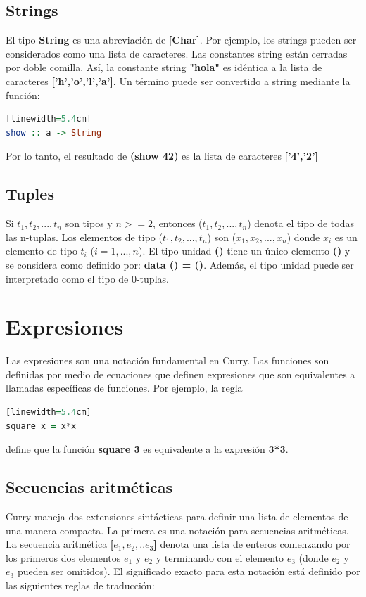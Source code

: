 \documentclass[10pt,journal,compsoc]{IEEEtran}
\begin{document}
\subsection{Strings}
El tipo \textbf{String} es una abreviaci\'on de \textbf{[Char]}. Por ejemplo, los strings pueden ser considerados como una lista de caracteres. Las constantes string est\'an cerradas por doble comilla. As\'i, la constante string \textbf{"hola"} es id\'entica a la lista de caracteres \textbf{['h','o','l','a']}. Un t\'ermino puede ser convertido a string mediante la funci\'on:
\begin{lstlisting}[language=Haskell, caption = {C\'odigo de conversi\'on de un t\'ermino a String}][linewidth=5.4cm]
show :: a -> String
\end{lstlisting}
Por lo tanto, el resultado de \textbf{(show 42)} es la lista de caracteres \textbf{['4','2']}

\subsection{Tuples}
Si $t_{1},t_{2},...,t_{n}$ son tipos y $n >= 2$, entonces ($t_{1},t_{2},...,t_{n}$) denota el tipo de todas las n-tuplas. Los elementos de tipo ($t_{1},t_{2},...,t_{n}$) son ($x_{1},x_{2},...,x_{n}$) donde $x_{i}$ es un elemento de tipo $t_{i}$ ($i = 1, ..., n$).
El tipo unidad \textbf{()} tiene un \'unico elemento \textbf{()} y se considera como definido por: \textbf{data () = ()}. Adem\'as, el tipo unidad puede ser interpretado como el tipo de 0-tuplas.

\section{Expresiones}
Las expresiones son una notaci\'on fundamental en Curry. Las funciones son definidas por medio de ecuaciones que definen expresiones que son equivalentes a llamadas espec\'ificas de funciones. Por ejemplo, la regla 
\begin{lstlisting}[language=Haskell, caption = {C\'odigo de una simple expresi\'on.}][linewidth=5.4cm]
square x = x*x
\end{lstlisting}
define que la funci\'on \textbf{square 3} es equivalente a la expresi\'on \textbf{3*3}.

\subsection{Secuencias aritm\'eticas} 
Curry maneja dos extensiones sint\'acticas para definir una lista de elementos de una manera compacta. La primera es una notaci\'on para secuencias aritm\'eticas. La secuencia aritm\'etica \textbf{[$e_{1} , e_{2} , . . e_{3}$]} denota una lista de enteros comenzando por los primeros dos elementos $e_{1}$ y $e_{2}$ y terminando con el elemento $e_{3}$ (donde $e_{2}$ y $e_{3}$ pueden ser omitidos). El significado exacto para esta notaci\'on est\'a definido por las siguientes reglas de traducci\'on: 
\end{document}
